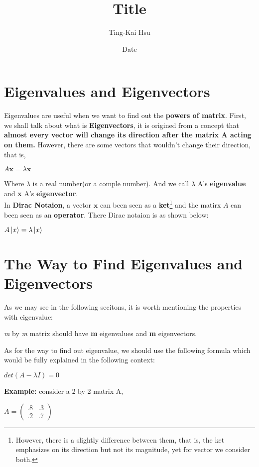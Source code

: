 \documentclass[12pt]{article}
\title{Title}
\author{Ting-Kai Hsu}
\date{Date}
\begin{document}
\section{Eigenvalues and Eigenvectors}
Eigenvalues are useful when we want to find out the \textbf{powers of matrix}. First, we shall talk about what is \textbf{Eigenvectors}, it is origined from a concept that \textbf{almost every vector will change its direction after the matrix A acting on them.} However, there are some vectors that wouldn't change their direction, that is,
\begin{center}
    $A\mathbf{x} = \lambda \mathbf{x}$
\end{center}
Where $\lambda$ is a real number(or a comple number).
And we call $\lambda$ A's \textbf{eigenvalue} and \textbf{x} A's \textbf{eigenvector}.
\\
In \textbf{Dirac Notaion}, a vector $\mathbf{x}$ can been seen as a \textbf{ket}\footnote{However, there is a slightly difference between them, that is, the ket emphasizes on its direction but not its magnitude, yet for vector we consider both.} and the matirx $A$ can been seen as an \textbf{operator}. There Dirac notaion is as shown below:

\begin{center}
   $A\ket*{x} = \lambda \ket*{x}$ 
\end{center}

\section{The Way to Find Eigenvalues and Eigenvectors}

As we may see in the following secitons, it is worth mentioning the properties with eigenvalue:

\begin{center}
    \textit{m} by \textit{m} matrix should have \textbf{m} eigenvalues and \textbf{m} eigenvectors. 
\end{center}

As for the way to find out eigenvalue, we should use the following formula which would be fully explained in the following context:

\begin{center}
    $det(A-\lambda I) = 0$
\end{center}

\textbf{Example:} consider a 2 by 2 matrix A,
    \begin{center}
    $A=\begin{pmatrix}
        .8 & .3\\
        .2 & .7
    \end{pmatrix}$
\end{center}
\end{document}
